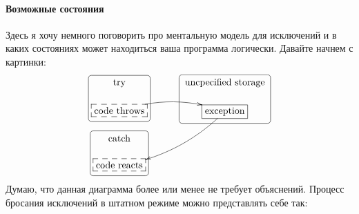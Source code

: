 \paragraph{Возможные состояния}

Здесь я хочу немного поговорить про ментальную модель для исключений и в каких состояниях может находиться ваша программа логически.
Давайте начнем с картинки:
\[
\xymatrix@R=15pt@C=15pt{
  {\text{try}}
 	{
	\save
   [].[d]*+[F-:<3pt>]\frm{}
   \restore
	}
  &{}&{\text{uncpecified storage}}
   	{
	\save
   [].[d]*+[F-:<3pt>]\frm{}
   \restore
	}
  \\
  {\text{code throws}}\ar@/^10pt/[rr]
       	{
	\save
   [].[]*[F--]\frm{}
   \restore
	}
  &{}&{\text{exception}}\ar@/^10pt/[ddll]
   	{
	\save
   [].[]*[F-]\frm{}
   \restore
	}
  \\
  {\text{catch}}
   	{
	\save
   [].[d]*+[F-:<3pt>]\frm{}
   \restore
	}
  &{}&{}\\
  {\text{code reacts}}
     	{
	\save
   [].[]*[F--]\frm{}
   \restore
	}
  &{}&{}\\
}
\]
Думаю, что данная диаграмма более или менее не требует объяснений.
Процесс бросания исключений в штатном режиме можно представлять себе так:
